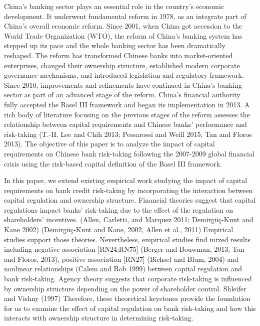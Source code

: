 \documentclass{article}
\begin{document}
China's banking sector plays an essential role in the country's economic
development. It underwent fundamental reform in 1978, as an integrate
part of China's overall economic reform. Since 2001, when China got
accession to the World Trade Organization (WTO), the reform of China's
banking system has stepped up its pace and the whole banking sector has
been dramatically reshaped. The reform has transformed Chinese banks
into market-oriented enterprises, changed their ownership structure,
established modern corporate governance mechanisms, and introduced
legislation and regulatory framework. Since 2010, improvements and
refinements have continued in China's banking sector as part of an
advanced stage of the reform. China's financial authority fully accepted
the Basel III framework and began its implementation in 2013. A rich
body of literature focusing on the previous stages of the reform
assesses the relationship between capital requirements and Chinese
banks' performance and risk-taking (T.-H. Lee and Chih 2013; Pessarossi
and Weill 2015; Tan and Floros 2013). The objective of this paper is to
analyze the impact of capital requirements on Chinese bank risk-taking
following the 2007-2009 global financial crisis using the risk-based
capital definition of the Basel III framework.

In this paper, we extend existing empirical work studying the impact of
capital requirements on bank credit risk-taking by incorporating the
interaction between capital regulation and ownership structure.
Financial theories suggest that capital regulations impact banks'
risk-taking due to the effect of the regulation on shareholders'
incentives. (Allen, Carletti, and Marquez 2011; Demirgüç-Kunt and Kane
2002) (Demirgüç-Kunt and Kane, 2002, Allen et al., 2011) Empirical
studies support those theories. Nevertheless, empirical studies find
mixed results including negative association {[}RN24;RN75{]} (Berger and
Bouwman, 2013, Tan and Floros, 2013), positive association {[}RN27{]}
(Bichsel and Blum, 2004) and nonlinear relationships (Calem and Rob
1999) between capital regulation and bank risk-taking. Agency theory
suggests that corporate risk-taking is influenced by ownership structure
depending on the power of shareholder control. Shleifer and Vishny
(1997) Therefore, these theoretical keystones provide the foundation for
us to examine the effect of capital regulation on bank risk-taking and
how this interacts with ownership structure in determining risk-taking.
\end{document}
